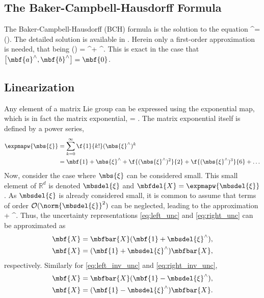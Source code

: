 \subsection{The Baker-Campbell-Hausdorff Formula}

The Baker-Campbell-Hausdorff (BCH) formula is the solution to the equation \cite{Barfoot2017}
\bdis
	^\wedge = \log\left(\right).
\edis
The detailed solution is available in \cite[pp.~230-232]{Barfoot2017}. Herein only a first-order approximation is needed, that being
\bdis
	\log\left(\right) = ^\wedge + ^\wedge.
\edis
This is exact in the case that  $\left[\mbf{a}^\wedge,\mbf{b}^\wedge\right] = \mbf{0}$.

\subsection{Linearization}

Any element of a matrix Lie group can be expressed using the exponential map, which is in fact the  matrix exponential,
\bdis
	 = \expmapw{\mbs{\xi}}.
\edis
The matrix exponential itself is defined by a power series,
\begin{align*}
	\expmapw{\mbs{\xi}} &= \sum_{k=0}^\infty \f{1}{k!}(\mbs{\xi}^\wedge)^k \\
	&= \mbf{1} + \mbs{\xi}^\wedge + \f{(\mbs{\xi}^\wedge)^2}{2} + \f{(\mbs{\xi}^\wedge)^3}{6} + \ldots
\end{align*}
Now, consider the case where $\mbs{\xi}$ can be considered small. This small element of $\mathbb{R}^d$ is denoted $\mbsdel{\xi}$ and $\mbfdel{X} = \expmapw{\mbsdel{\xi}}$. As $\mbsdel{\xi}$ is already considered small, it is common to assume that terms of order $\mathcal{O}(\norm{\mbsdel{\xi}}^2)$ can be neglected, leading to the approximation
\bdis
	 \approx {} + \mbsdel{\xi}^\wedge.
\edis
Thus, the uncertainty representations \eqref{eq:left_unc} and \eqref{eq:right_unc} can be approximated as
\begin{align*}
	\mbf{X} &= \mbfbar{X}(\mbf{1} + \mbsdel{\xi}^\wedge), \\
	\mbf{X} &= (\mbf{1} + \mbsdel{\xi}^\wedge)\mbfbar{X},
\end{align*}
respectively. Similarly for \eqref{eq:left_inv_unc} and \eqref{eq:right_inv_unc}, 
\begin{align*}
	\mbf{X} &= \mbfbar{X}(\mbf{1} - \mbsdel{\xi}^\wedge), \\
	\mbf{X} &= (\mbf{1} - \mbsdel{\xi}^\wedge)\mbfbar{X}.
\end{align*}

